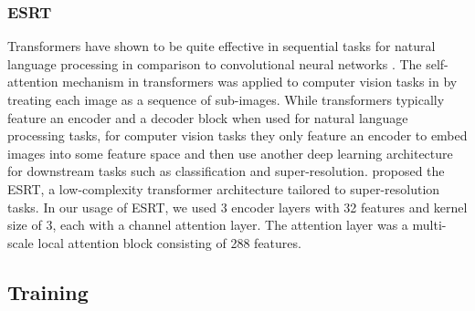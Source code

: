 


\subsubsection{ESRT}

Transformers have shown to be quite effective in sequential tasks  for natural language processing in comparison to convolutional neural networks \cite{Vaswani2017Attention}. The self-attention mechanism in transformers was applied to computer vision tasks in \cite{dosovitskiy2021an} by treating each image as a sequence of sub-images. While transformers typically feature an encoder and a decoder block when used for natural language processing tasks, for computer vision tasks they only feature an encoder to embed images into some feature space and then use another deep learning architecture for downstream tasks such as classification and super-resolution. \cite{LuESRT2022} proposed the \acf{ESRT}, a low-complexity transformer architecture tailored to super-resolution tasks. In our usage of \ac{ESRT}, we used 3 encoder layers with 32 features and kernel size of 3, each with a channel attention layer. The attention layer was a multi-scale local attention block consisting of 288 features. 


\subsection{Training}
\label{subsec:training}

